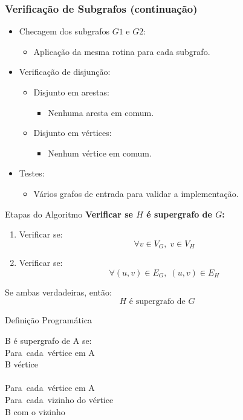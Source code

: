 \documentclass{beamer}
\begin{document}
\begin{frame}
\frametitle{Verificação de Subgrafos (continuação)}
\begin{itemize}
  \item Checagem dos subgrafos $G1$ e $G2$:
  \begin{itemize}
    \item Aplicação da mesma rotina para cada subgrafo.
  \end{itemize}
  \item Verificação de disjunção:
  \begin{itemize}
    \item Disjunto em arestas:
    \begin{itemize}
      \item Nenhuma aresta em comum.
    \end{itemize}
    \item Disjunto em vértices:
    \begin{itemize}
      \item Nenhum vértice em comum.
    \end{itemize}
  \end{itemize}
  \item Testes:
  \begin{itemize}
    \item Vários grafos de entrada para validar a implementação.
  \end{itemize}
\end{itemize}
\end{frame}

\begin{frame}{Etapas do Algoritmo}
\textbf{Verificar se \(H\) é supergrafo de \(G\):}
\begin{enumerate}
    \item Verificar se:
    \[
    \forall v \in V_G, \; v \in V_H
    \]
    \item Verificar se:
    \[
    \forall (u, v) \in E_G, \; (u, v) \in E_H
    \]
\end{enumerate}
Se ambas verdadeiras, então:
\[
H \text{ é supergrafo de } G
\]
\end{frame}

\begin{frame}{Definição Programática}

B é supergrafo de A se:\\

Para\ cada\ vértice em A\\
\quad {} B  vértice\\
\quad\quad {}\\

Para\ cada\ vértice em A\\
\quad Para\ cada\ vizinho do vértice\\
\quad\quad {} B  com o vizinho\\
\quad\quad\quad {}\\


\end{frame}
\end{document}
